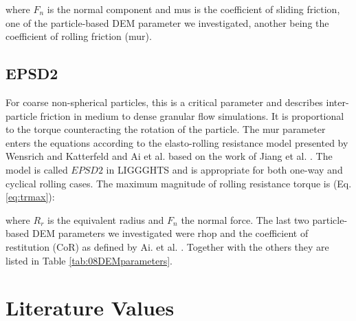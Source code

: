 where $F_n$ is the normal component and \acs{mus} is the coefficient of sliding
friction, one of the particle-based \acs{DEM} parameter we investigated, 
another being the coefficient of rolling friction (\acs{mur}). 

\subsection{EPSD2}
\label{subsec:epsd2}

For coarse non-spherical particles, this is a critical parameter and describes
inter-particle friction in medium to dense granular flow simulations. It is proportional to the 
torque counteracting the rotation of the particle. The \acs{mur} parameter enters the 
equations according to the elasto-rolling resistance model presented by Wensrich and 
Katterfeld \cite{RefWorks:87} and Ai et al. \cite{RefWorks:131} 
based on the work of Jiang et al. \cite{RefWorks:143}. 
The model is called $EPSD2$ in \acs{LIGGGHTS} and is appropriate for both one-way and cyclical rolling cases.
The maximum magnitude of rolling resistance torque is (Eq. \ref{eq:trmax}):



where $R_r$ is the equivalent radius and $F_n$ the normal force.
The last two particle-based \acs{DEM} parameters we investigated were \acs{rhop}
and the coefficient of restitution (\acs{CoR}) as defined by Ai. et al.
\cite{RefWorks:131}.
Together with the others they are listed in Table \ref{tab:08DEMparameters}.\\



\section{Literature Values}
\label{sec:literaturevalues}

